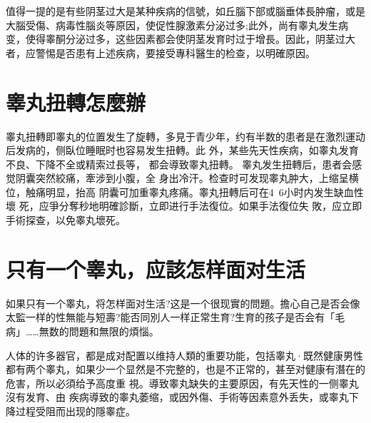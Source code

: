 \documentclass[12pt,UTF8]{ctexbook}
\begin{document}
值得一提的是有些阴茎过大是某种疾病的信號，如丘腦下部或腦垂体長肿瘤，或是大腦受傷、病毒性腦炎等原因，使促性腺激素分泌过多;此外，尚有睾丸发生病变，使得睾酮分泌过多，这些因素都会使阴茎发育时过于增長。因此，阴茎过大者，应警惕是否患有上述疾病，要接受專科醫生的检查，以明確原因。

\section{睾丸扭轉怎麼辦}

睾丸扭轉即睾丸的位置发生了旋轉，多見于青少年，约有半数的患者是在激烈運动后发病的，侧臥位睡眠时也容易发生扭轉。此
外，某些先天性疾病，如睾丸发育不良、下降不全或精索过長等，
都会導致睾丸扭轉。
睾丸发生扭轉后，患者会感觉阴囊突然絞痛，牽涉到小腹，全
身出冷汗。检查时可发现睾丸肿大，上缩呈横位，触痛明显，抬高
阴囊可加重睾丸疼痛。睾丸扭轉后可在4~6小时内发生缺血性壞
死，应爭分奪秒地明確診斷，立即进行手法復位。如果手法復位失
敗，应立即手術探查，以免睾丸壞死。

\section{只有一个睾丸，应該怎样面对生活}

如果只有一个睾丸，将怎样面对生活?这是一个很现實的問題。擔心自己是否会像太監一样的性無能与短壽?能否同別人一样正常生育?生育的孩子是否会有「毛病」……無数的問題和無限的煩惱。

人体的许多器官，都是成对配置以维持人類的重要功能，包括睾丸·既然健康男性都有两个睾丸，如果少一个显然是不完整的，也是不正常的，甚至对健康有潛在的危害，所以必須给予高度重
視。導致睾丸缺失的主要原因，有先天性的一侧睾丸沒有发育、由
疾病導致的睾丸萎缩，或因外傷、手術等因素意外丢失，或睾丸下
降过程受阻而出现的隱睾症。
\end{document}
